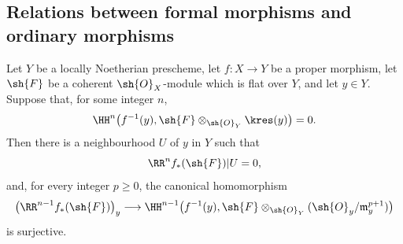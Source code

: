 \subsection{Relations between formal morphisms and ordinary morphisms}
\label{subsection:III.4.6}

\begin{proposition}[4.6.1]
\label{III.4.6.1}
Let $Y$ be a locally Noetherian prescheme, let $f:X\to Y$ be a
proper morphism, let $\sh{F}$ be a coherent $\sh{O}_X$-module which
is flat over $Y$, and let $y\in Y$.  Suppose that, for some integer
$n$,
\[
  \HH^n\bigl(f^{-1}(y),
    \sh{F}\otimes_{\sh{O}_Y}\kres(y)\bigr)=0.
\]
Then there is a neighbourhood $U$ of $y$ in $Y$ such that
\[
  \RR^n f_*(\sh{F})|U=0,
\]
and, for every integer $p\geq0$, the canonical homomorphism
\[
  \bigl(\RR^{n-1}f_*(\sh{F})\bigr)_y
  \longrightarrow
  \HH^{n-1}\bigl(f^{-1}(y),
    \sh{F}\otimes_{\sh{O}_Y}
      (\sh{O}_y/\mathfrak m_y^{p+1})\bigr)
\]
 is surjective.
\end{proposition}

